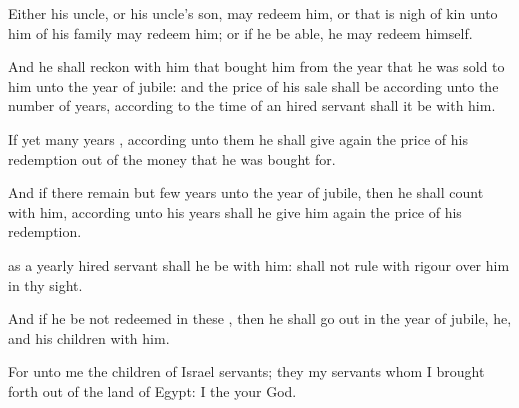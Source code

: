 {Either his
uncle, or his
uncle’s
son, may
redeem him, or
{} that is
nigh of
kin unto him of his
family may
redeem him; or if he be
able, he may
redeem
himself.

And he shall
reckon with him that
bought him from the
year that he was
sold to him unto the
year of
jubile: and the
price of his
sale shall be according unto the
number of
years, according to the
time of an hired
servant shall it be with him.

If
{} yet
many
years
{},
according unto them he shall give
again the price of his
redemption out of the
money that he was
bought for.

And if there
remain but
few
years unto the
year of
jubile, then he shall
count with him,
{}
according unto his
years shall he give him
again the price of his
redemption.

 as a
yearly hired
servant shall he be with him:
{} shall not
rule with
rigour over him in thy
sight.

And if he be not
redeemed in these
{}, then he shall go
out in the
year of
jubile,
{} he, and his
children with him.

For unto me the
children of
Israel
{}
servants; they
{} my
servants whom I brought
forth out of the
land of
Egypt: I
{} the
{} your
God.




\par }
